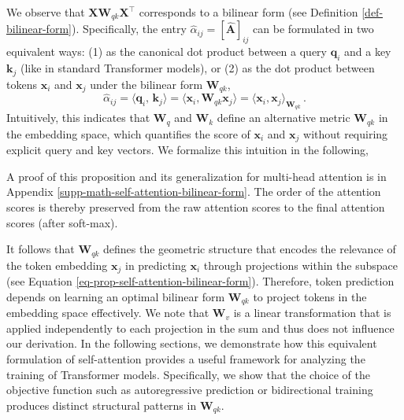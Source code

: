 We observe that $\bm{X} \bm{W}_{qk}\bm{X}^\top$ corresponds to a bilinear form (see Definition \ref{def-bilinear-form}). 
%
Specifically, the entry $\hat{\alpha}_{ij} = [\hat{\bm{A}}]_{ij}$ can be formulated in two equivalent ways: (1) as the canonical dot product between a query $\bm{q}_i$ and a key $\bm{k}_j$  (like in standard Transformer models), or (2) as the dot product between tokens $\bm{x}_i$ and $\bm{x}_j$ under the bilinear form $\bm{W}_{qk}$,
%
\begin{equation}
    \hat{\alpha}_{ij} = \langle \bm{q}_i, \,\bm{k}_j \rangle = \langle \bm{x}_i, \bm{W}_{qk} \bm{x}_j \rangle = \langle \bm{x}_i, \bm{x}_j \rangle_{\bm{W}_{qk}} \,.
\end{equation}
%
Intuitively, this indicates that $\bm{W}_q$ and $\bm{W}_k$ define an alternative metric $\bm{W}_{qk}$ in the embedding space, which quantifies the score of $\bm{x}_i$ and $\bm{x}_j$ without requiring explicit query and key vectors.
%
We formalize this intuition in the following,
%

%
A proof of this proposition and its generalization for multi-head attention is in Appendix \ref{supp-math-self-attention-bilinear-form}.
%
The order of the attention scores is thereby preserved from the raw attention scores to the final attention scores (after soft-max).

It follows that $\bm{W}_{qk}$ defines the geometric structure that encodes the relevance of the token embedding  $\bm{x}_j$ in predicting $\bm{x}_i$ through projections within the subspace (see Equation \eqref{eq-prop-self-attention-bilinear-form}). 
%
Therefore, token prediction depends on learning an optimal bilinear form $\bm{W}_{qk}$ to project tokens in the embedding space effectively.
%
We note that $\bm{W}_v$ is a linear transformation that is applied independently to each projection in the sum and thus does not influence our derivation.
%
In the following sections, we demonstrate how this equivalent formulation of self-attention provides a useful framework for analyzing the training of Transformer models.
%
Specifically, we show that the choice of the objective function such as autoregressive prediction \citep{radfordLanguageModelsAre2019} or bidirectional training \citep{devlinBERTPretrainingDeep2019} produces distinct structural patterns in $\bm{W}_{qk}$.
%






